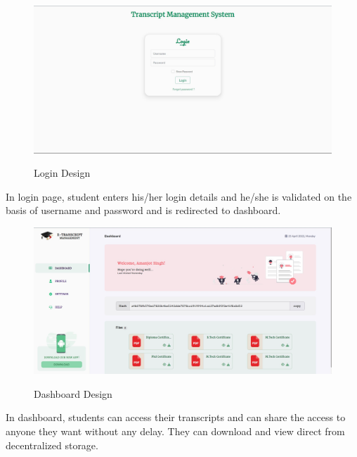 \begin{figure}[H]
    \centering
    \includegraphics[scale=0.32]{images/login.jpg}\\[0.5cm]
    \caption{Login Design}
    \label{fig:my_label}
\end{figure}

\noindent
In login page, student enters his/her login details and he/she is validated on the basis of username and password and is redirected to dashboard.

\begin{figure}[H]
    \centering
    \includegraphics[scale=0.32]{images/Dashboard.jpg}\\[0.5cm]
    \caption{Dashboard Design}
    \label{fig:my_label}
\end{figure}

\noindent
In dashboard, students can access their transcripts and can share the access to anyone they want without any delay.
They can download and view direct from decentralized storage.

